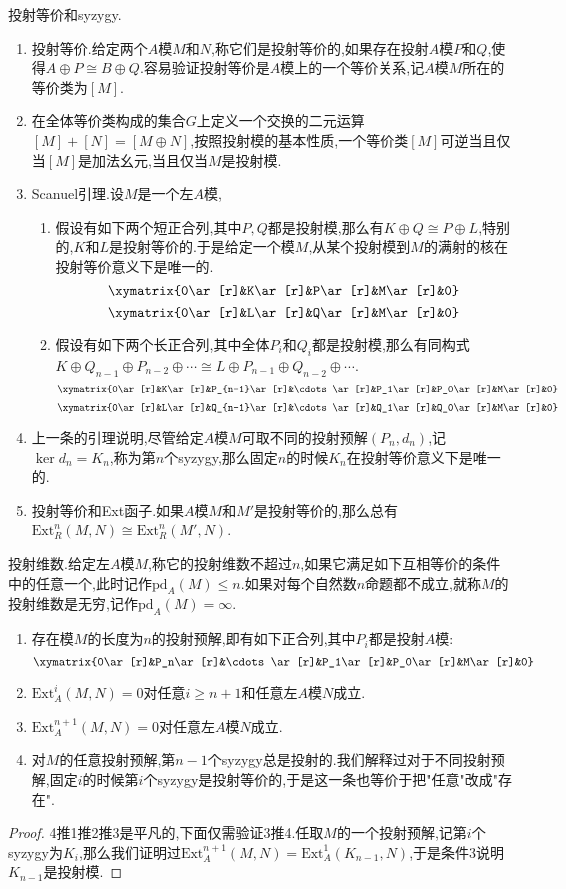 投射等价和syzygy.
\begin{enumerate}
	\item 投射等价.给定两个$A$模$M$和$N$,称它们是投射等价的,如果存在投射$A$模$P$和$Q$,使得$A\oplus P\cong B\oplus Q$.容易验证投射等价是$A$模上的一个等价关系,记$A$模$M$所在的等价类为$[M]$.
	\item 在全体等价类构成的集合$G$上定义一个交换的二元运算$[M]+[N]=[M\oplus N]$,按照投射模的基本性质,一个等价类$[M]$可逆当且仅当$[M]$是加法幺元,当且仅当$M$是投射模.
	\item Scanuel引理.设$M$是一个左$A$模,
	\begin{enumerate}
		\item 假设有如下两个短正合列,其中$P,Q$都是投射模,那么有$K\oplus Q\cong P\oplus L$,特别的,$K$和$L$是投射等价的.于是给定一个模$M$,从某个投射模到$M$的满射的核在投射等价意义下是唯一的.
		$$\xymatrix{0\ar[r]&K\ar[r]&P\ar[r]&M\ar[r]&0}$$
		$$\xymatrix{0\ar[r]&L\ar[r]&Q\ar[r]&M\ar[r]&0}$$
		\item 假设有如下两个长正合列,其中全体$P_i$和$Q_i$都是投射模,那么有同构式$K\oplus Q_{n-1}\oplus P_{n-2}\oplus\cdots\cong L\oplus P_{n-1}\oplus Q_{n-2}\oplus\cdots$.
		$$\xymatrix{0\ar[r]&K\ar[r]&P_{n-1}\ar[r]&\cdots\ar[r]&P_1\ar[r]&P_0\ar[r]&M\ar[r]&0}$$
		$$\xymatrix{0\ar[r]&L\ar[r]&Q_{n-1}\ar[r]&\cdots\ar[r]&Q_1\ar[r]&Q_0\ar[r]&M\ar[r]&0}$$
	\end{enumerate}
    \item 上一条的引理说明,尽管给定$A$模$M$可取不同的投射预解$(P_n,d_n)$,记$\ker d_n=K_n$,称为第$n$个syzygy,那么固定$n$的时候$K_n$在投射等价意义下是唯一的.
    \item 投射等价和Ext函子.如果$A$模$M$和$M'$是投射等价的,那么总有$\mathrm{Ext}_R^n(M,N)\cong\mathrm{Ext}_R^n(M',N)$.
\end{enumerate}

投射维数.给定左$A$模$M$,称它的投射维数不超过$n$,如果它满足如下互相等价的条件中的任意一个,此时记作$\mathrm{pd}_A(M)\le n$.如果对每个自然数$n$命题都不成立,就称$M$的投射维数是无穷,记作$\mathrm{pd}_A(M)=\infty$.
\begin{enumerate}
	\item 存在模$M$的长度为$n$的投射预解,即有如下正合列,其中$P_i$都是投射$A$模:
	$$\xymatrix{0\ar[r]&P_n\ar[r]&\cdots\ar[r]&P_1\ar[r]&P_0\ar[r]&M\ar[r]&0}$$
	\item $\mathrm{Ext}_A^i(M,N)=0$对任意$i\ge n+1$和任意左$A$模$N$成立.
	\item $\mathrm{Ext}_A^{n+1}(M,N)=0$对任意左$A$模$N$成立.
	\item 对$M$的任意投射预解,第$n-1$个syzygy总是投射的.我们解释过对于不同投射预解,固定$i$的时候第$i$个syzygy是投射等价的,于是这一条也等价于把"任意"改成"存在".
\end{enumerate}
\begin{proof}
	
	4推1推2推3是平凡的,下面仅需验证3推4.任取$M$的一个投射预解,记第$i$个syzygy为$K_i$,那么我们证明过$\mathrm{Ext}_A^{n+1}(M,N)=\mathrm{Ext}_A^1(K_{n-1},N)$,于是条件3说明$K_{n-1}$是投射模.
\end{proof}

